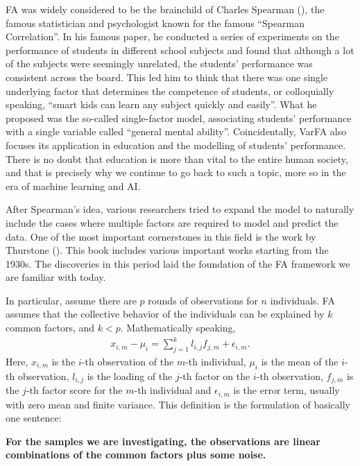 FA was widely considered to be the brainchild of Charles Spearman
(\cite{Spearman_1904}), the famous statistician and psychologist known for the
famous ``Spearman Correlation''. In his famous paper, he conducted a series of
experiments on the performance of students in different school subjects and
found that although a lot of the subjects were seemingly unrelated, the
students' performance was consistent across the board. This led him to think
that there was one single underlying factor that determines the competence of
students, or colloquially speaking, ``smart kids can learn any subject quickly
and easily''. What he proposed was the so-called single-factor model,
associating students' performance with a single variable called ``general
mental ability''. Coincidentally, VarFA also focuses its application in
education and the modelling of students' performance. There is no doubt that
education is more than vital to the entire human society, and that is precisely
why we continue to go back to such a topic, more so in the era of machine
learning and AI.

After Spearman's idea, various researchers tried to expand the model to
naturally include the cases where multiple factors are required to model and
predict the data. One of the most important cornerstones in this field is the
work by Thurstone (\cite{thurstone1947multiple}). This book includes various
important works starting from the 1930s. The discoveries in this period laid
the foundation of the FA framework we are familiar with today.

In particular, assume there are $p$ rounds of observations for $n$ individuals.
FA assumes that the collective behavior of the individuals can be explained by
$k$ common factors, and $k < p$. Mathematically speaking,
\begin{align} \label{eq:FA}
    x_{i,m} - \mu_i = \sum_{j=1}^k l_{i,j}f_{j,m} + \epsilon_{i,m}.
\end{align}
Here, $x_{i,m}$ is the $i$-th observation of the $m$-th individual, $\mu_i$ is the mean of the $i$-th observation, $l_{i,j}$ is the loading of the $j$-th factor on the $i$-th observation, $f_{j,m}$ is the $j$-th factor score for the $m$-th individual and $\epsilon_{i,m}$ is the error term, usually with zero mean and finite variance. This definition is the formulation of basically one sentence:

\textbf{For the samples we are investigating, the observations are linear combinations of the common factors plus some noise.}

